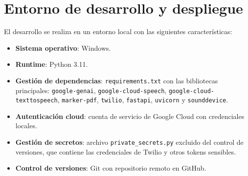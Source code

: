 \section{Entorno de desarrollo y despliegue}
\label{sec:entorno_desarrollo_despliegue}

El desarrollo se realiza en un entorno local con las siguientes características:

\begin{itemize}
    \item \textbf{Sistema operativo}: Windows.
    \item \textbf{Runtime}: Python 3.11.
    \item \textbf{Gestión de dependencias}: \texttt{requirements.txt} con las bibliotecas principales: \texttt{google-genai}, \texttt{google-cloud-speech}, \texttt{google-cloud-texttospeech}, \texttt{marker-pdf}, \texttt{twilio}, \texttt{fastapi}, \texttt{uvicorn} y \texttt{sounddevice}.
    \item \textbf{Autenticación cloud}: cuenta de servicio de Google Cloud con credenciales locales.
    \item \textbf{Gestión de secretos}: archivo \texttt{private\_secrets.py} excluido del control de versiones, que contiene las credenciales de Twilio y otros tokens sensibles.
    \item \textbf{Control de versiones}: Git con repositorio remoto en GitHub.
\end{itemize}

